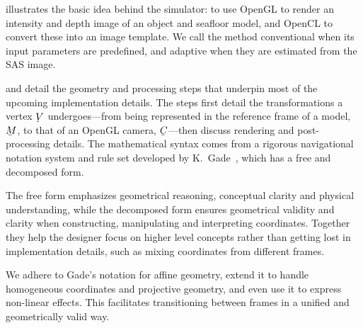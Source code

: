  illustrates the basic idea behind the simulator: to use OpenGL to render an intensity and depth image of an object and seafloor model, and OpenCL to convert these into an image template. We call the method conventional when its input parameters are predefined, and adaptive when they are estimated from the SAS image.



 and  detail the geometry and processing steps that underpin most of the upcoming implementation details. The steps first detail the transformations a vertex $\udot{V}$ undergoes---from being represented in the reference frame of a model, $\ubar{M}$, to that of an OpenGL camera, $\ubar{C}$---then discuss rendering and post-processing details. The mathematical syntax comes from a rigorous navigational notation system and rule set developed by K.~Gade~\cite{Gade2018}, which has a free and decomposed form.


The free form emphasizes geometrical reasoning, conceptual clarity and physical understanding, while the decomposed form ensures geometrical validity and clarity when constructing, manipulating and interpreting coordinates. Together they help the designer focus on higher level concepts rather than getting lost in implementation details, such as mixing coordinates from different frames.%
%

We adhere to Gade's notation for affine geometry, extend it to handle homogeneous coordinates and projective geometry, and even use it to express non-linear effects. This facilitates transitioning between frames in a unified and geometrically valid way.




